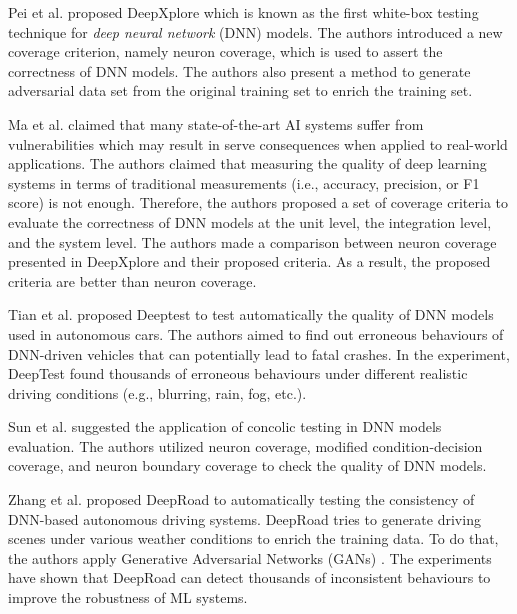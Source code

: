 \documentclass[12pt]{article}
\begin{document}
Pei et al. proposed DeepXplore \cite{DeepXplore} which is known as the first white-box testing technique for \textit{deep neural network} (DNN) models. The authors introduced a new coverage criterion, namely neuron coverage, which is used to assert the correctness of DNN models. The authors also present a method to generate adversarial data set from the original training set to enrich the training set. %

Ma et al. \cite{deep-gauge} claimed that many state-of-the-art AI systems suffer from vulnerabilities which may result in serve consequences when applied to real-world applications. The authors claimed that measuring the quality of deep learning systems in terms of traditional measurements (i.e., accuracy, precision, or F1 score) is not enough. Therefore, the authors proposed a set of coverage criteria to evaluate the correctness of DNN models at the unit level, the integration level, and the system level. The authors made a comparison between neuron coverage presented in DeepXplore \cite{DeepXplore} and their proposed criteria. As a result, the proposed criteria are better than neuron coverage.

Tian et al. proposed Deeptest \cite{deeptest} to test automatically the quality of DNN models used in autonomous cars. The authors aimed to find out erroneous behaviours of DNN-driven vehicles that can potentially lead to fatal crashes. In the experiment, DeepTest found thousands of erroneous behaviours under different realistic driving conditions (e.g., blurring, rain, fog, etc.).

Sun et al. \cite{concolic-testing} suggested the application of concolic testing in DNN models evaluation. The authors utilized neuron coverage, modified condition-decision coverage, and neuron boundary coverage to check the quality of DNN models.

Zhang et al. proposed DeepRoad \cite{deeproad} to automatically testing the consistency of DNN-based autonomous driving systems. DeepRoad tries to generate driving scenes under various weather conditions to enrich the training data. To do that, the authors apply Generative Adversarial Networks (GANs) \cite{gan}. The experiments have shown that DeepRoad can detect thousands of inconsistent behaviours to improve the robustness of ML systems.
\end{document}
